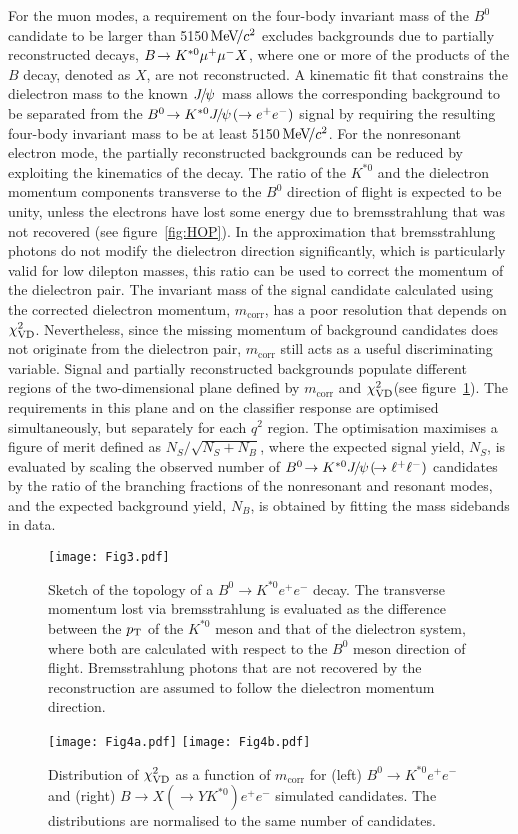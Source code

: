 \documentclass[12pt,a4paper]{article}
\def\Ppsi        {\ensuremath{\uppsi}\xspace}
\def\PB      {\ensuremath{\mathrm{B}}\xspace}
\def\PJ      {\ensuremath{\mathrm{J}}\xspace}
\def\PK      {\ensuremath{\mathrm{K}}\xspace}
\def\Pe      {\ensuremath{\mathrm{e}}\xspace}
\def\Ppsi        {\ensuremath{\psi}\xspace}
\def\PB      {\ensuremath{B}\xspace}
\def\PJ      {\ensuremath{J}\xspace}
\def\PK      {\ensuremath{K}\xspace}
\def\Pe      {\ensuremath{e}\xspace}
\def\epem       {\ensuremath{\Pe^+\Pe^-}\xspace}
\def\ellm       {\ensuremath{\ell^-}\xspace}
\def\ellp       {\ensuremath{\ell^+}\xspace}
\def\kaon  {\ensuremath{\PK}\xspace}
\def\Kstarz  {\ensuremath{\kaon^{*0}}\xspace}
\def\B       {\ensuremath{\PB}\xspace}
\def\Bz      {\ensuremath{\B^0}\xspace}
\def\Bd      {\ensuremath{\B^0}\xspace}
\def\jpsi     {\ensuremath{{\PJ\mskip -3mu/\mskip -2mu\Ppsi\mskip 2mu}}\xspace}
\newcommand{\decay}[2]{\ensuremath{#1\!\to #2}\xspace}         \def\ra                 {\ensuremath{\rightarrow}\xspace}
\def\to                 {\ensuremath{\rightarrow}\xspace}
\def\qsq       {\ensuremath{q^2}\xspace}
\newcommand{\mevcc}{\ensuremath{{\mathrm{\,Me\kern -0.1em V\!/}c^2}}\xspace}
\def\pt         {\mbox{$p_{\rm T}$}\xspace}
\def\mcorr{\ensuremath{m_{\textrm{corr}}}\xspace}
\def\chisqfd{\ensuremath{\chi^2_{\rm VD}}\xspace}
\def\ll{\ensuremath{\ellp\ellm}\xspace}
\def\BdToKstee{\mbox{\decay{\Bd}{\Kstarz \epem}}\xspace}
\def\BdToKstJPsll{\mbox{\decay{\Bd}{\Kstarz \jpsi(\decay{}{\ll})}}\xspace}
\def\BdToKstJPsee{\mbox{\decay{\Bd}{\Kstarz \jpsi(\to\epem)}}\xspace}
\def\BToXmm{\mbox{\decay{\B}{\Kstarz \mumu X}}\xspace}
\def\BToXee{\mbox{\decay{\B}{X(\to Y \Kstarz)\epem}}\xspace}
\begin{document}
For the muon modes, a requirement on the four-body invariant mass of the \Bz candidate to be larger than 5150\mevcc excludes backgrounds due to partially reconstructed decays, \BToXmm, where one or more of the products of the \B decay, denoted as $X$, are not reconstructed.
A kinematic fit that constrains the dielectron mass to the known \jpsi mass allows the corresponding background to be separated from the \BdToKstJPsee signal by requiring the resulting four-body invariant mass to be at least 5150\mevcc.
For the nonresonant electron mode, the partially reconstructed backgrounds can be reduced by exploiting the kinematics of the decay. 
The ratio of the \Kstarz and the dielectron momentum components transverse to the \Bz direction of flight is expected to be unity, unless the electrons have lost some energy due to bremsstrahlung that was not recovered (see figure~\ref{fig:HOP}).
In the approximation that bremsstrahlung photons do not modify the dielectron direction significantly, which is particularly valid for low dilepton masses, this ratio can be used to correct the momentum of the dielectron pair.
The invariant mass of the signal candidate calculated using the corrected dielectron momentum, \mcorr, has a poor resolution that depends on \chisqfd.
Nevertheless, since the missing momentum of background candidates does not originate from the dielectron pair, \mcorr still acts as a useful discriminating variable.
Signal and partially reconstructed backgrounds populate different regions of the two-dimensional plane defined by \mcorr and \chisqfd (see figure~\ref{fig:HOP2D}).
The requirements in this plane and on the classifier response are optimised simultaneously, but separately for each \qsq region.
The optimisation maximises a figure of merit defined as $N_S / \sqrt{N_S+N_B}$, where the expected signal yield, $N_S$, is evaluated by scaling the observed number of \BdToKstJPsll candidates by the ratio of the branching fractions of the nonresonant and resonant modes, and the expected background yield, $N_B$, is obtained by fitting the mass sidebands in data.

\begin{figure}[t!]
\centering
\texttt{[image: Fig3.pdf]} 
\caption{Sketch of the topology of a \BdToKstee decay. The transverse momentum lost via bremsstrahlung is evaluated as the difference between the \pt of the \Kstarz meson and that of the dielectron system, where both are calculated with respect to the \Bz meson direction of flight. Bremsstrahlung photons that are not recovered by the reconstruction are assumed to follow the dielectron momentum direction.}
\label{fig:HOP}
\vspace{0.5cm}
\centering
\texttt{[image: Fig4a.pdf]}
\texttt{[image: Fig4b.pdf]}
\caption{Distribution of \chisqfd as a function of \mcorr for (left) \BdToKstee and (right) \BToXee simulated candidates. The distributions are normalised to the same number of candidates.}
\label{fig:HOP2D}
\end{figure}
\end{document}
